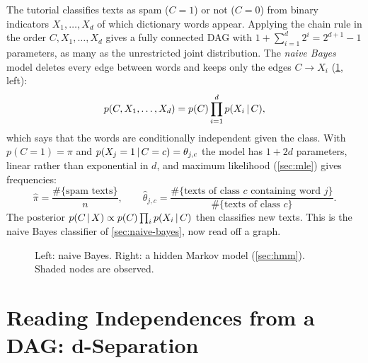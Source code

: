 The tutorial classifies texts as spam ($C=1$) or not ($C=0$) from binary indicators $X_1,\dots,X_d$ of which dictionary words appear. Applying the chain rule in the order $C,X_1,\dots,X_d$ gives a fully connected DAG with $1+\sum_{i=1}^d2^i=2^{d+1}-1$ parameters, as many as the unrestricted joint distribution. The \emph{naive Bayes} model deletes every edge between words and keeps only the edges $C\to X_i$ (\cref{fig:nb-hmm}, left):
\[
p(C,X_1,\dots,X_d)=p(C)\prod_{i=1}^dp(X_i\,|\, C),
\]
which says that the words are conditionally independent given the class. With $p(C=1)=\pi$ and $p(X_j=1\,|\, C=c)=\theta_{j,c}$ the model has $1+2d$ parameters, linear rather than exponential in $d$, and maximum likelihood (\cref{sec:mle}) gives frequencies:
\[
\hat\pi=\frac{\#\{\text{spam texts}\}}{n},\qquad \hat\theta_{j,c}=\frac{\#\{\text{texts of class $c$ containing word $j$}\}}{\#\{\text{texts of class $c$}\}}.
\]
The posterior $p(C\,|\, X)\propto p(C)\prod_ip(X_i\,|\, C)$ then classifies new texts. This is the naive Bayes classifier of \cref{sec:naive-bayes}, now read off a graph.

\begin{figure}[ht]
\centering
{}
\caption{Left: naive Bayes. Right: a hidden Markov model (\cref{sec:hmm}). Shaded nodes are observed.}
\label{fig:nb-hmm}
\end{figure}

\section{Reading Independences from a DAG: d-Separation}\label{sec:dsep}

